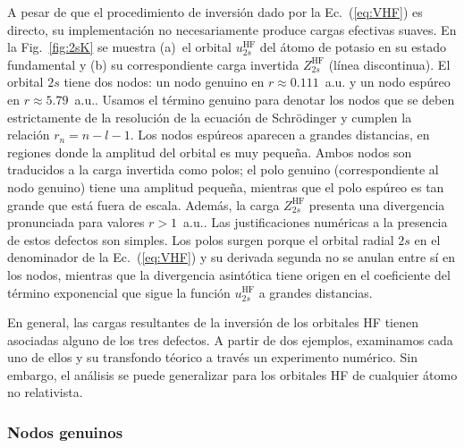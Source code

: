 A pesar de que el procedimiento de inversión dado por la 
Ec.~(\ref{eq:VHF}) es directo, su implementación no necesariamente 
produce cargas efectivas suaves. En la Fig.~\ref{fig:2sK} se muestra 
(a)~el orbital $u_{2s}^{\mathrm{HF}}$ del átomo de potasio en su estado 
fundamental y (b) su correspondiente carga invertida 
$Z_{2s}^{\mathrm{HF}}$ (línea discontinua).
El orbital $2s$ tiene dos nodos: un nodo genuino en 
$r\approx 0.111$~a.u. y un nodo espúreo en $r\approx 5.79$~a.u.. Usamos 
el término genuino para denotar los nodos que se deben estrictamente de 
la resolución de la ecuación de Schr\"odinger y cumplen la relación 
$r_n=n-l-1$. Los nodos espúreos aparecen a grandes distancias, en 
regiones donde la amplitud del orbital es muy pequeña. Ambos nodos son 
traducidos a la carga invertida como polos; el polo genuino 
(correspondiente al nodo genuino) tiene una amplitud pequeña, mientras 
que el polo espúreo es tan grande que está fuera de escala. Además, la 
carga $Z_{2s}^{\mathrm{HF}}$ presenta una divergencia pronunciada para 
valores $r>1$~a.u.. Las justificaciones numéricas a la presencia de 
estos defectos son simples. Los polos surgen porque el orbital radial 
$2s$ en el denominador de la Ec.~(\ref{eq:VHF}) y su derivada segunda no 
se anulan entre sí en los nodos, mientras que la divergencia asintótica 
tiene origen en el coeficiente del término exponencial que sigue la 
función $u_{2s}^{\mathrm{HF}}$ a grandes distancias.



En general, las cargas resultantes de la inversión de los orbitales HF 
tienen asociadas alguno de los tres defectos. A partir de dos ejemplos, 
examinamos cada uno de ellos y su transfondo téorico a través un 
experimento numérico. Sin embargo, el análisis se puede generalizar para 
los orbitales HF de cualquier átomo no relativista.

\subsubsection{Nodos genuinos}

